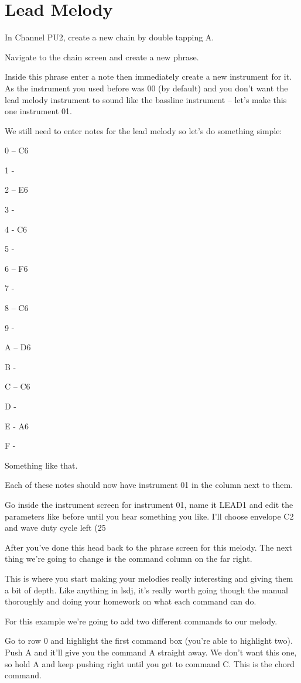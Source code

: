 \documentclass[]{article}
\begin{document}
\section{Lead Melody}

In Channel PU2, create a new chain by double tapping A.

Navigate to the chain screen and create a new phrase.

Inside this phrase enter a note then immediately create a new instrument for it. As the instrument you used before was 00 (by default) and you don’t want the lead melody instrument to sound like the bassline instrument – let’s make this one instrument 01.

We still need to enter notes for the lead melody so let’s do something simple:

0 – C6

1 -

2 – E6

3 -

4 - C6

5 -

6 – F6

7 -

8 – C6

9 -

A – D6

B -

C – C6

D -

E - A6

F -


Something like that.

Each of these notes should now have instrument 01 in the column next to them.

Go inside the instrument screen for instrument 01, name it LEAD1 and edit the parameters like before until you hear something you like. I’ll choose envelope C2 and wave duty cycle left (25%

After you’ve done this head back to the phrase screen for this melody. The next thing we’re going to change is the command column on the far right.

This is where you start making your melodies really interesting and giving them a bit of depth. Like anything in lsdj, it’s really worth going though the manual thoroughly and doing your homework on what each command can do.

For this example we’re going to add two different commands to our melody.

Go to row 0 and highlight the first command box (you’re able to highlight two). Push A and it’ll give you the command A straight away. We don’t want this one, so hold A and keep pushing right until you get to command C. This is the chord command.
\end{document}
